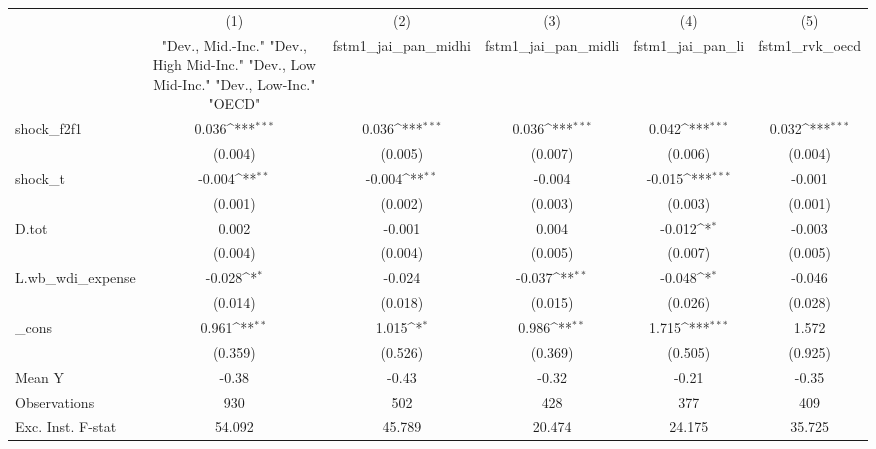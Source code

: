 {
\def\sym#1{\ifmmode^{#1}\else\(^{#1}\)\fi}
\begin{tabular}{l*{5}{c}}
\toprule
            &\multicolumn{1}{c}{(1)}&\multicolumn{1}{c}{(2)}&\multicolumn{1}{c}{(3)}&\multicolumn{1}{c}{(4)}&\multicolumn{1}{c}{(5)}\\
            &\multicolumn{1}{c}{ "Dev., Mid.-Inc." "Dev., High Mid-Inc." "Dev., Low Mid-Inc." "Dev., Low-Inc." "OECD" }&\multicolumn{1}{c}{fstm1\_jai\_pan\_midhi}&\multicolumn{1}{c}{fstm1\_jai\_pan\_midli}&\multicolumn{1}{c}{fstm1\_jai\_pan\_li}&\multicolumn{1}{c}{fstm1\_rvk\_oecd}\\
\midrule
shock\_f2f1  &       0.036\sym{***}&       0.036\sym{***}&       0.036\sym{***}&       0.042\sym{***}&       0.032\sym{***}\\
            &     (0.004)         &     (0.005)         &     (0.007)         &     (0.006)         &     (0.004)         \\
\addlinespace
shock\_t     &      -0.004\sym{**} &      -0.004\sym{**} &      -0.004         &      -0.015\sym{***}&      -0.001         \\
            &     (0.001)         &     (0.002)         &     (0.003)         &     (0.003)         &     (0.001)         \\
\addlinespace
D.tot       &       0.002         &      -0.001         &       0.004         &      -0.012\sym{*}  &      -0.003         \\
            &     (0.004)         &     (0.004)         &     (0.005)         &     (0.007)         &     (0.005)         \\
\addlinespace
L.wb\_wdi\_expense&      -0.028\sym{*}  &      -0.024         &      -0.037\sym{**} &      -0.048\sym{*}  &      -0.046         \\
            &     (0.014)         &     (0.018)         &     (0.015)         &     (0.026)         &     (0.028)         \\
\addlinespace
\_cons      &       0.961\sym{**} &       1.015\sym{*}  &       0.986\sym{**} &       1.715\sym{***}&       1.572         \\
            &     (0.359)         &     (0.526)         &     (0.369)         &     (0.505)         &     (0.925)         \\
\midrule
Mean Y      &       -0.38         &       -0.43         &       -0.32         &       -0.21         &       -0.35         \\
Observations&         930         &         502         &         428         &         377         &         409         \\
Exc. Inst. F-stat&      54.092         &      45.789         &      20.474         &      24.175         &      35.725         \\
\bottomrule
\end{tabular}
}
